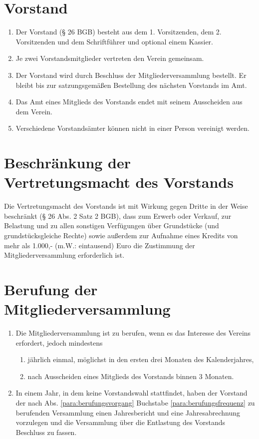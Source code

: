 \documentclass[a4paper]{article}
\begin{document}
\section{Vorstand}\label{sec:vorstand}

\begin{enumerate}
\item Der Vorstand (§ 26 BGB) besteht aus dem 1. Vorsitzenden, dem 2. Vorsitzenden und dem Schriftführer und optional einem Kassier.
\item Je zwei Vorstandsmitglieder vertreten den Verein gemeinsam.
\item Der Vorstand wird durch Beschluss der Mitgliederversammlung bestellt. Er bleibt bis zur satzungsgemäßen Bestellung des nächsten Vorstands im Amt.
\item Das Amt eines Mitglieds des Vorstands endet mit seinem Ausscheiden aus dem Verein.
\item Verschiedene Vorstandsämter können nicht in einer Person vereinigt werden.
\end{enumerate}


\section{Beschränkung der Vertretungsmacht des Vorstands}\label{sec:beschraenkung_der_vertretungsmacht_des_vorstands}

Die Vertretungsmacht des Vorstands ist mit Wirkung gegen Dritte in der Weise beschränkt (§ 26 Abs. 2 Satz 2 BGB), dass zum Erwerb oder Verkauf, zur Belastung und zu allen sonstigen Verfügungen über Grundstücke (und grundstücksgleiche Rechte) sowie außerdem zur Aufnahme eines Kredits von mehr als 1.000,- (m.W.: eintausend) Euro die Zustimmung der Mitgliederversammlung erforderlich ist.


\section{Berufung der Mitgliederversammlung}\label{sec:berufung_der_mitgliederversammlung}

\begin{enumerate}
\item Die Mitgliederversammlung ist zu berufen, wenn es das Interesse des Vereins erfordert, jedoch mindestens\label{para:berufungsvorgang}
    \begin{enumerate}
    \item jährlich einmal, möglichst in den ersten drei Monaten des Kalenderjahres,\label{para:berufungsfrequenz}
    \item nach Ausscheiden eines Mitglieds des Vorstands binnen 3 Monaten.
    \end{enumerate}
\item In einem Jahr, in dem keine Vorstandswahl stattfindet, haben der Vorstand der nach Abs. \ref{para:berufungsvorgang} Buchstabe \ref{para:berufungsfrequenz} zu berufenden Versammlung einen Jahresbericht und eine Jahresabrechnung vorzulegen und die Versammlung über die Entlastung des Vorstands Beschluss zu fassen.
\end{enumerate}
\end{document}
